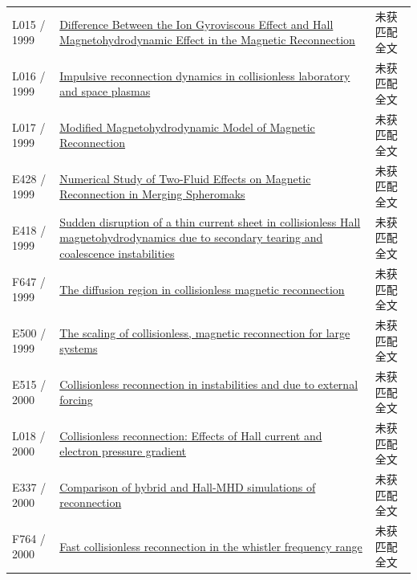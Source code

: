 \begin{longtable}{P{24mm}P{97mm}P{27mm}}
L015 / 1999 & \href{https://doi.org/10.1088/0256-307x/16/11/028}{Difference Between the Ion Gyroviscous Effect and Hall Magnetohydrodynamic Effect in the Magnetic Reconnection} & 未获匹配全文\\

L016 / 1999 & \href{https://doi.org/10.1029/1998ja900094}{Impulsive reconnection dynamics in collisionless laboratory and space plasmas} & 未获匹配全文\\

L017 / 1999 & \href{https://doi.org/10.1088/0256-307x/16/6/026}{Modified Magnetohydrodynamic Model of Magnetic Reconnection} & 未获匹配全文\\

E428 / 1999 & \href{https://ui.adsabs.harvard.edu/abs/1999APS..DPP.CP104B/abstract}{Numerical Study of Two-Fluid Effects on Magnetic Reconnection in Merging Spheromaks} & 未获匹配全文\\

E418 / 1999 & \href{https://doi.org/10.1029/1999gl003627}{Sudden disruption of a thin current sheet in collisionless Hall magnetohydrodynamics due to secondary tearing and coalescence instabilities} & 未获匹配全文\\

F647 / 1999 & \href{https://doi.org/10.1063/1.873436}{The diffusion region in collisionless magnetic reconnection} & 未获匹配全文\\

E500 / 1999 & \href{https://doi.org/10.1029/1999gl900481}{The scaling of collisionless,  magnetic reconnection for large systems} & 未获匹配全文\\

E515 / 2000 & \href{https://doi.org/10.1063/1.873822}{Collisionless reconnection in instabilities and due to external forcing} & 未获匹配全文\\

L018 / 2000 & \href{https://doi.org/10.1029/1999ja000357}{Collisionless reconnection: Effects of Hall current and electron pressure gradient} & 未获匹配全文\\

E337 / 2000 & \href{http://ui.adsabs.harvard.edu/abs/2000APS..DPPNP1059Y/abstract}{Comparison of hybrid and Hall-MHD simulations of reconnection} & 未获匹配全文\\

F764 / 2000 & \href{https://doi.org/10.1063/1.874076}{Fast collisionless reconnection in the whistler frequency range} & 未获匹配全文\\


\end{longtable}
